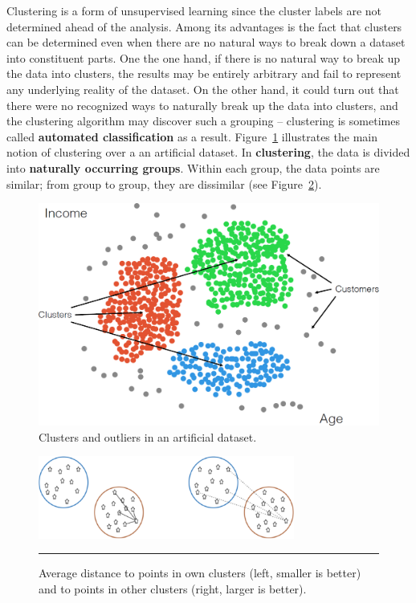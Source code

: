 Clustering is a form of unsupervised learning since the cluster labels are not determined ahead of the analysis. Among its advantages is the fact that clusters can be determined even when there are no natural ways to break down a dataset into constituent parts. One the one hand, if there is no natural way to break up the data into clusters, the results may be entirely arbitrary and fail to represent any underlying reality of the dataset. On the other hand, it could turn out that there were no recognized ways to naturally break up the data into clusters, and the clustering algorithm may discover such a grouping -- clustering is sometimes called \textbf{automated classification} as a result. Figure~\ref{fig:clust2} illustrates the main notion of clustering over a an artificial dataset. \newpage\noindent
In \textbf{clustering}, the data is divided into \textbf{naturally occurring groups}. Within each group, the data points are similar; from group to group, they are dissimilar (see Figure~\ref{fig:clust1}). 
\begin{figure}[!t]
\centering
\includegraphics[width=\textwidth]{images/DSML/clustering2.png}
\caption[\small Clusters and outliers in an artificial dataset]{\small Clusters and outliers in an artificial dataset.}\label{fig:clust2}
\end{figure}
\afterpage{\FloatBarrier}
\begin{figure}[!t]
\centering
\includegraphics[width=0.75\textwidth]{images/DSML/clustering1.png}
\caption[\small Cluster distances.]{\small Average distance to points in own clusters (left, smaller is better) and to points in other clusters (right, larger is better).}\hrule\label{fig:clust1}
\end{figure}

